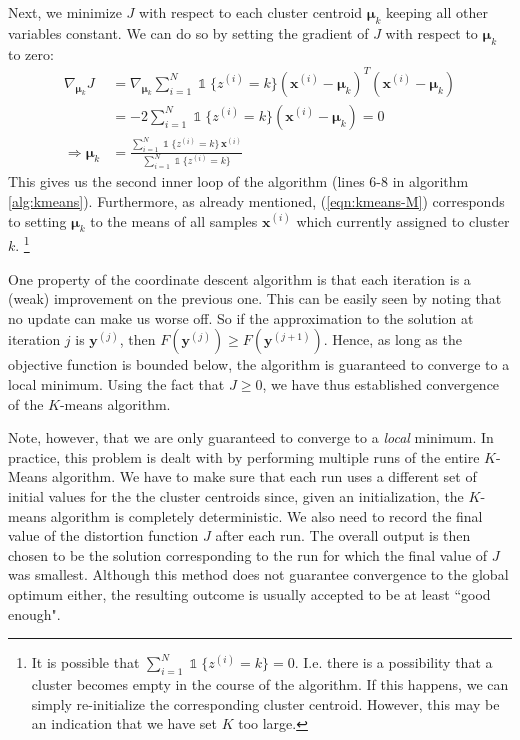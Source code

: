 \documentclass[final,3p,times,twocolumn]{elsarticle}
\let\bs\boldsymbol
\DeclareMathOperator*{\id}{\mathds{1}}
\begin{document}
Next, we minimize $J$ with respect to each cluster centroid $\bs\mu_k$ keeping all other variables constant.
We can do so by setting the gradient of $J$ with respect to $\bs\mu_k$ to zero:
\begin{equation}
\label{eqn:kmeans-M}
\begin{split}
\nabla_{\bs\mu_k} J &= \nabla_{\bs\mu_k} \sum_{i=1}^N\id\{z^{(i)}=k\}(\bs x^{(i)}-\bs\mu_k)^T(\bs x^{(i)}-\bs\mu_k)\\
&= -2 \sum_{i=1}^N\id\{z^{(i)}=k\}(\bs x^{(i)}-\bs\mu_k) = 0\\
\Rightarrow \bs\mu_k &= \frac{\sum_{i=1}^N\id\{z^{(i)} = k\}\,\bs x^{(i)}}{\sum_{i=1}^N\id\{z^{(i)}=k\}}
\end{split}
\end{equation}
This gives us the second inner loop of the algorithm (lines 6-8 in algorithm \ref{alg:kmeans}).
Furthermore, as already mentioned, (\ref{eqn:kmeans-M}) corresponds to setting $\bs \mu_k$ to the means of all samples $\bs x^{(i)}$ which currently assigned to cluster $k$.
\footnote{It is possible that $\sum_{i=1}^N\id\{z^{(i)}=k\} = 0$.
I.e. there is a possibility that a cluster becomes empty in the course of the algorithm.
If this happens, we can simply re-initialize the corresponding cluster centroid.
However, this may be an indication that we have set $K$ too large.}

One property of the coordinate descent algorithm is that each iteration is a (weak) improvement on the previous one.
This can be easily seen by noting that no update can make us worse off. 
So if the approximation to the solution at iteration $j$ is $\bs y^{(j)}$, then $F(\bs y^{(j)}) \geq F(\bs y^{(j+1)})$.
Hence, as long as the objective function is bounded below, the algorithm is guaranteed to converge to a local minimum.
Using the fact that $J \geq 0$, we have thus established convergence of the $K$-means algorithm.

Note, however, that we are only guaranteed to converge to a \emph{local} minimum.
In practice, this problem is dealt with by performing multiple runs of the entire $K$-Means algorithm.
We have to make sure that each run uses a different set of initial values for the the cluster centroids since, given an initialization, the $K$-means algorithm is completely deterministic.
We also need to record the final value of the distortion function $J$ after each run.
The overall output is then chosen to be the solution corresponding to the run for which the final value of $J$ was smallest.
Although this method does not guarantee convergence to the global optimum either, the resulting outcome is usually accepted to be at least ``good enough".
\end{document}
